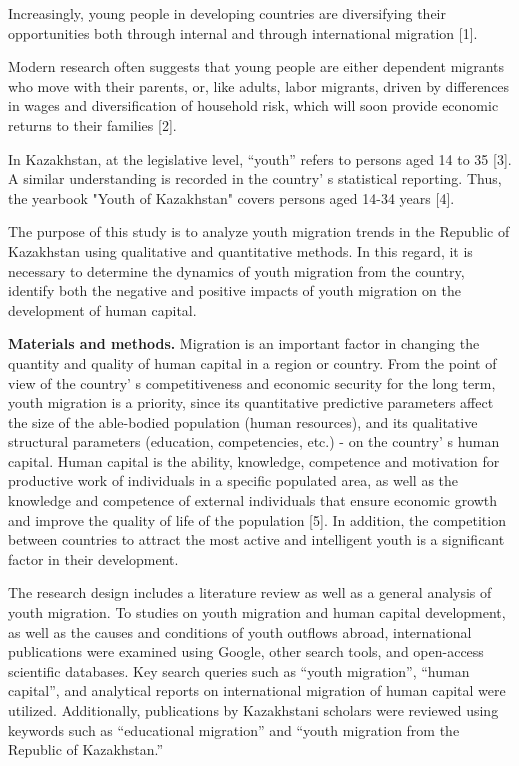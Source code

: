 Increasingly, young people in developing countries are diversifying
their opportunities both through internal and through international
migration {[}1{]}.

Modern research often suggests that young people are either dependent
migrants who move with their parents, or, like adults, labor migrants,
driven by differences in wages and diversification of household risk,
which will soon provide economic returns to their families {[}2{]}.

In Kazakhstan, at the legislative level, ``youth'' refers to persons
aged 14 to 35 {[}3{]}. A similar understanding is recorded in the
country' s statistical reporting. Thus, the yearbook
"Youth of Kazakhstan" covers persons aged 14-34 years {[}4{]}.

The purpose of this study is to analyze youth migration trends in the
Republic of Kazakhstan using qualitative and quantitative methods. In
this regard, it is necessary to determine the dynamics of youth
migration from the country, identify both the negative and positive
impacts of youth migration on the development of human capital.

{\bfseries Materials and methods.} Migration is an important factor in
changing the quantity and quality of human capital in a region or
country. From the point of view of the country' s
competitiveness and economic security for the long term, youth migration
is a priority, since its quantitative predictive parameters affect the
size of the able-bodied population (human resources), and its
qualitative structural parameters (education, competencies, etc.) - on
the country' s human capital. Human capital is the
ability, knowledge, competence and motivation for productive work of
individuals in a specific populated area, as well as the knowledge and
competence of external individuals that ensure economic growth and
improve the quality of life of the population {[}5{]}. In addition, the
competition between countries to attract the most active and intelligent
youth is a significant factor in their development.

The research design includes a literature review as well as a general
analysis of youth migration. To studies on youth migration and human
capital development, as well as the causes and conditions of youth
outflows abroad, international publications were examined using Google,
other search tools, and open-access scientific databases. Key search
queries such as ``youth migration'', ``human capital'', and analytical
reports on international migration of human capital were utilized.
Additionally, publications by Kazakhstani scholars were reviewed using
keywords such as ``educational migration'' and ``youth migration from
the Republic of Kazakhstan.''

